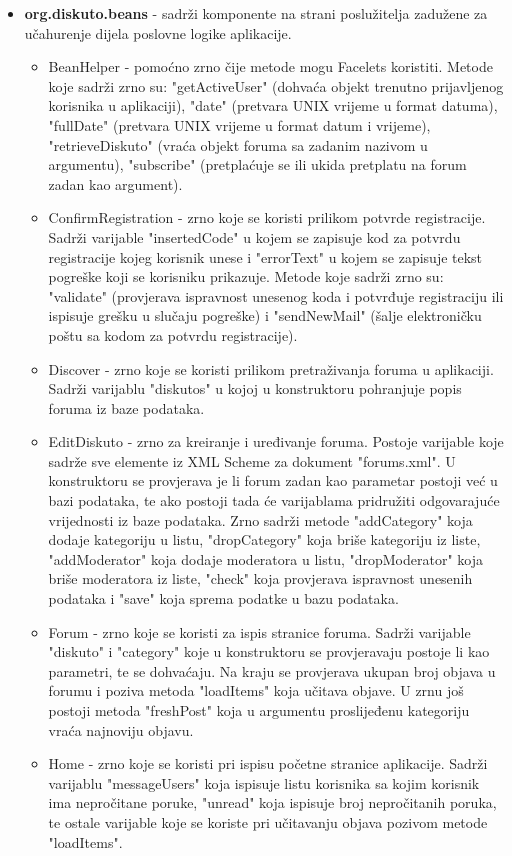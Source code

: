 \documentclass{foi}
\begin{document}
\begin{itemize}
\item \textbf{org.diskuto.beans} - sadrži komponente na strani poslužitelja zadužene za učahurenje dijela poslovne logike aplikacije.
\begin{itemize}
        \item BeanHelper - pomoćno zrno čije metode mogu Facelets koristiti. Metode koje sadrži zrno su: "getActiveUser" (dohvaća objekt trenutno prijavljenog korisnika u aplikaciji), "date" (pretvara UNIX vrijeme u format datuma), "fullDate" (pretvara UNIX vrijeme u format datum i vrijeme), "retrieveDiskuto" (vraća objekt foruma sa zadanim nazivom u argumentu), "subscribe" (pretplaćuje se ili ukida pretplatu na forum zadan kao argument).
	\item ConfirmRegistration - zrno koje se koristi prilikom potvrde registracije. Sadrži varijable "insertedCode" u kojem se zapisuje kod za potvrdu registracije kojeg korisnik unese i "errorText" u kojem se zapisuje tekst pogreške koji se korisniku prikazuje. Metode koje sadrži zrno su: "validate" (provjerava ispravnost unesenog koda i potvrđuje registraciju ili ispisuje grešku u slučaju pogreške) i  "sendNewMail" (šalje elektroničku poštu sa kodom za potvrdu registracije).
	\item Discover - zrno koje se koristi prilikom pretraživanja foruma u aplikaciji. Sadrži varijablu "diskutos" u kojoj u konstruktoru pohranjuje popis foruma iz baze podataka.
	\item EditDiskuto - zrno za kreiranje i uređivanje foruma. Postoje varijable koje sadrže sve elemente iz XML Scheme za dokument "forums.xml". U konstruktoru se provjerava je li forum zadan kao parametar postoji već u bazi podataka, te ako postoji tada će varijablama pridružiti odgovarajuće vrijednosti iz baze podataka. Zrno sadrži metode "addCategory" koja dodaje kategoriju u listu, "dropCategory" koja briše kategoriju iz liste, "addModerator" koja dodaje moderatora u listu, "dropModerator" koja briše moderatora iz liste, "check" koja provjerava ispravnost unesenih podataka i "save" koja sprema podatke u bazu podataka.
	\item Forum - zrno koje se koristi za ispis stranice foruma. Sadrži varijable "diskuto" i "category" koje u konstruktoru se provjeravaju postoje li kao parametri, te se dohvaćaju. Na kraju se provjerava ukupan broj objava u forumu i poziva metoda "loadItems" koja učitava objave. U zrnu još postoji metoda "freshPost" koja u argumentu proslijeđenu kategoriju vraća najnoviju objavu.
	\item Home - zrno koje se koristi pri ispisu početne stranice aplikacije. Sadrži varijablu "messageUsers" koja ispisuje listu korisnika sa kojim korisnik ima nepročitane poruke, "unread" koja ispisuje broj nepročitanih poruka, te ostale varijable koje se koriste pri učitavanju objava pozivom metode "loadItems".

\end{itemize}
\end{itemize}
\end{document}
